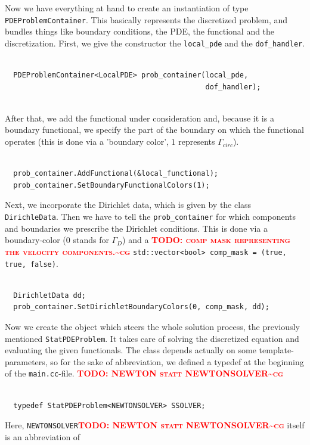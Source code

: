 \documentclass[prodmode,acmtoms]{acmsmall}
\numberwithin{equation}{section}
\newcommand{\todocg}[1]{\textbf{\textsc{\textcolor{red}{TODO: #1\textasciitilde cg}}}}
\begin{document}
Now we have everything at hand to create an instantiation of type \texttt{PDEProblemContainer}. This basically represents the discretized problem, and bundles things like boundary conditions, the PDE, the functional and the discretization. First, we give the constructor the \texttt{local\_pde} and the \texttt{dof\_handler}.
\begin{lstlisting}

  PDEProblemContainer<LocalPDE> prob_container(local_pde,
                                               dof_handler);
                                               
\end{lstlisting}
After that, we add the functional under consideration and, because it is a boundary functional, we specify the part of the boundary on which the functional operates (this is done via a 'boundary color', $1$ represents $\Gamma_{circ}$).
\begin{lstlisting}

  prob_container.AddFunctional(&local_functional);
  prob_container.SetBoundaryFunctionalColors(1);

\end{lstlisting}
Next, we incorporate the Dirichlet data, which is given by the class \texttt{DirichleData}. Then we have to tell the \texttt{prob\_container} for which components and boundaries we prescribe the Dirichlet conditions. This is done via a boundary-color (0 stands for $\Gamma_D$) and a \todocg{comp mask representing the velocity components.} \texttt{std::vector<bool> comp\_mask = (true, true, false)}.
\begin{lstlisting}

  DirichletData dd;
  prob_container.SetDirichletBoundaryColors(0, comp_mask, dd);

\end{lstlisting}
Now we create the object which steers the whole solution process, the previously mentioned \texttt{StatPDEProblem}. It takes care of solving the discretized equation and evaluating the given functionals. The class depends actually on some template-parameters, so for the sake of abbreviation, we defined a typedef at the beginning of the \texttt{main.cc}-file.
\todocg{NEWTON statt NEWTONSOLVER}
\begin{lstlisting}

  typedef StatPDEProblem<NEWTONSOLVER> SSOLVER;

\end{lstlisting}
Here, \texttt{NEWTONSOLVER}\todocg{NEWTON statt NEWTONSOLVER} itself is an abbreviation of
\end{document}
